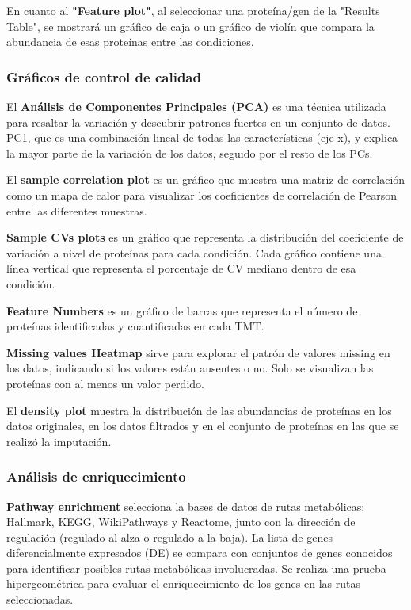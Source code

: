 \documentclass[nochap]{config/ejercicios}
\begin{document}
En cuanto al \textbf{"Feature plot"}, al seleccionar una proteína/gen de la "Results Table", se mostrará un gráfico de caja o un gráfico de violín que compara la abundancia de esas proteínas entre las condiciones.

\subsubsection{Gráficos de control de calidad}
El \textbf{Análisis de Componentes Principales (PCA)} es una técnica utilizada para resaltar la variación y descubrir patrones fuertes en un conjunto de datos. PC1, que es una combinación lineal de todas las características (eje x), y explica la mayor parte de la variación de los datos, seguido por el resto de los PCs.

El \textbf{sample correlation plot} es un gráfico que muestra una matriz de correlación como un mapa de calor para visualizar los coeficientes de correlación de Pearson entre las diferentes muestras.

\textbf{Sample CVs plots} es un gráfico que representa la distribución del coeficiente de variación a nivel de proteínas para cada condición. Cada gráfico contiene una línea vertical que representa el porcentaje de CV mediano dentro de esa condición.

\textbf{Feature Numbers} es un gráfico de barras que representa el número de proteínas identificadas y cuantificadas en cada TMT.

\textbf{Missing values Heatmap} sirve para explorar el patrón de valores missing en los datos, indicando si los valores están ausentes o no. Solo se visualizan las proteínas con al menos un valor perdido.

El \textbf{density plot} muestra la distribución de las abundancias de proteínas en los datos originales, en los datos filtrados y en el conjunto de proteínas en las que se realizó la imputación.

\subsubsection{Análisis de enriquecimiento}
\textbf{Pathway enrichment} selecciona la bases de datos de rutas metabólicas: Hallmark, KEGG, WikiPathways y Reactome, junto con la dirección de regulación (regulado al alza o regulado a la baja). La lista de genes diferencialmente expresados (DE) se compara con conjuntos de genes conocidos para identificar posibles rutas metabólicas involucradas. Se realiza una prueba hipergeométrica para evaluar el enriquecimiento de los genes en las rutas seleccionadas.
\end{document}
